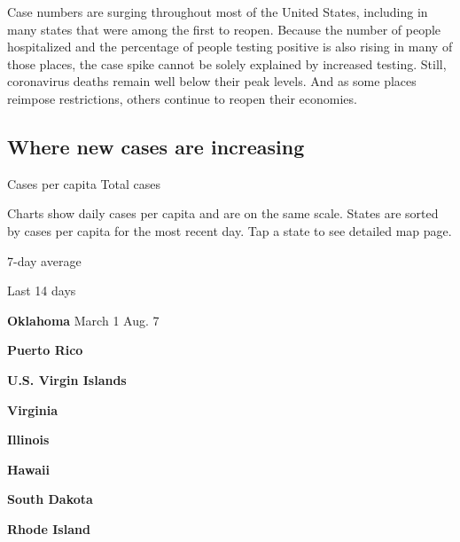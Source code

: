 Case numbers are surging throughout most of the United States, including
in many states that were among the first to reopen. Because the number
of people hospitalized and the percentage of people testing positive is
also rising in many of those places, the case spike cannot be solely
explained by increased testing. Still, coronavirus deaths remain well
below their peak levels. And as some places reimpose restrictions,
others continue to reopen their economies.

\hypertarget{where-new-cases-are-increasing}{%
\subsection{Where new cases are
increasing}\label{where-new-cases-are-increasing}}

Cases per capita Total cases

Charts show daily cases per capita and are on the same scale. States are
sorted by cases per capita for the most recent day. Tap a state to see
detailed map page.

\href{https://www.nytimes.com/interactive/2020/us/oklahoma-coronavirus-cases.html}{}

7-day average

Last 14 days

\textbf{Oklahoma} March 1 Aug. 7

\href{https://www.nytimes.com/interactive/2020/us/puerto-rico-coronavirus-cases.html}{}

\textbf{Puerto Rico}

\textbf{U.S. Virgin Islands}

\href{https://www.nytimes.com/interactive/2020/us/virginia-coronavirus-cases.html}{}

\textbf{Virginia}

\href{https://www.nytimes.com/interactive/2020/us/illinois-coronavirus-cases.html}{}

\textbf{Illinois}

\href{https://www.nytimes.com/interactive/2020/us/hawaii-coronavirus-cases.html}{}

\textbf{Hawaii}

\href{https://www.nytimes.com/interactive/2020/us/south-dakota-coronavirus-cases.html}{}

\textbf{South Dakota}

\href{https://www.nytimes.com/interactive/2020/us/rhode-island-coronavirus-cases.html}{}

\textbf{Rhode Island}

